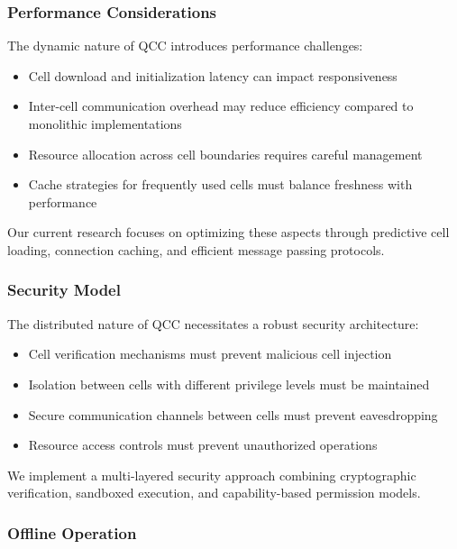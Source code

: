 \documentclass[11pt,a4paper]{article}
\begin{document}
\subsubsection{Performance Considerations}

The dynamic nature of QCC introduces performance challenges:

\begin{itemize}
    \item Cell download and initialization latency can impact responsiveness
    \item Inter-cell communication overhead may reduce efficiency compared to monolithic implementations
    \item Resource allocation across cell boundaries requires careful management
    \item Cache strategies for frequently used cells must balance freshness with performance
\end{itemize}

Our current research focuses on optimizing these aspects through predictive cell loading, connection caching, and efficient message passing protocols.

\subsubsection{Security Model}

The distributed nature of QCC necessitates a robust security architecture:

\begin{itemize}
    \item Cell verification mechanisms must prevent malicious cell injection
    \item Isolation between cells with different privilege levels must be maintained
    \item Secure communication channels between cells must prevent eavesdropping
    \item Resource access controls must prevent unauthorized operations
\end{itemize}

We implement a multi-layered security approach combining cryptographic verification, sandboxed execution, and capability-based permission models.

\subsubsection{Offline Operation}
\end{document}
